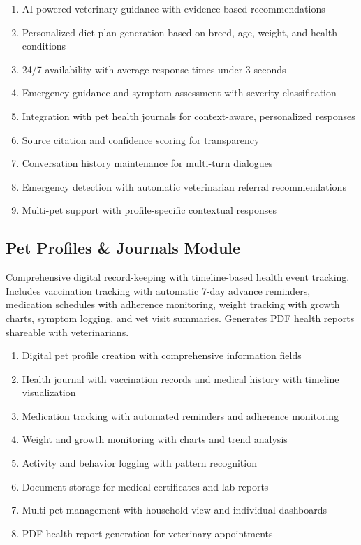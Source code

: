 \begin{enumerate}
    \item AI-powered veterinary guidance with evidence-based recommendations
    \item Personalized diet plan generation based on breed, age, weight, and health conditions
    \item 24/7 availability with average response times under 3 seconds
    \item Emergency guidance and symptom assessment with severity classification
    \item Integration with pet health journals for context-aware, personalized responses
    \item Source citation and confidence scoring for transparency
    \item Conversation history maintenance for multi-turn dialogues
    \item Emergency detection with automatic veterinarian referral recommendations
    \item Multi-pet support with profile-specific contextual responses
\end{enumerate}

\subsection{Pet Profiles \& Journals Module}

Comprehensive digital record-keeping with timeline-based health event tracking. Includes vaccination tracking with automatic 7-day advance reminders, medication schedules with adherence monitoring, weight tracking with growth charts, symptom logging, and vet visit summaries. Generates PDF health reports shareable with veterinarians.

\begin{enumerate}
    \item Digital pet profile creation with comprehensive information fields
    \item Health journal with vaccination records and medical history with timeline visualization
    \item Medication tracking with automated reminders and adherence monitoring
    \item Weight and growth monitoring with charts and trend analysis
    \item Activity and behavior logging with pattern recognition
    \item Document storage for medical certificates and lab reports
    \item Multi-pet management with household view and individual dashboards
    \item PDF health report generation for veterinary appointments
\end{enumerate}

